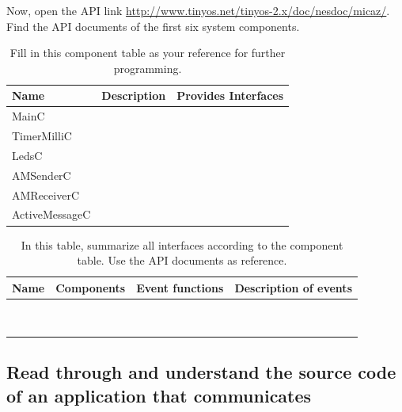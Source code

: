 \documentclass[letterpaper,12pt]{article}
\begin{document}
    Now, open the API link \url{http://www.tinyos.net/tinyos-2.x/doc/nesdoc/micaz/}. Find the API
    documents of the first six system components.
    \begin{table}[htbp]
    \begin{center}
        \begin{tabular}{ |l|l|l| }
            \hline
            \textbf{Name} & \textbf{Description} & \textbf{Provides Interfaces} \\ \hline
            MainC & & \\ \hline
            TimerMilliC & & \\ \hline
            LedsC & & \\ \hline
            AMSenderC & & \\ \hline
            AMReceiverC & & \\ \hline
            ActiveMessageC & & \\ \hline
        \end{tabular}
    \end{center}
    \caption{Fill in this component table as your reference for further programming.}
    \end{table}
    \begin{table}[!hbp]
    \begin{center}
        \begin{tabular}{ |l|l|l|l| }
            \hline
            \textbf{Name} & \textbf{Components} & \textbf{Event functions} & \textbf{Description of events} \\ \hline
            & & & \\ \hline
            & & & \\ \hline
            & & & \\ \hline
            & & & \\ \hline
            & & & \\ \hline
            & & & \\ \hline
            & & & \\ \hline
            & & & \\ \hline
            & & & \\ \hline
        \end{tabular}
    \end{center}
    \caption{In this table, summarize all interfaces according to the component table. Use the API documents as reference.}
    \end{table}
\newpage
\subsection*{Read through and understand the source code of an application that communicates}
\end{document}
